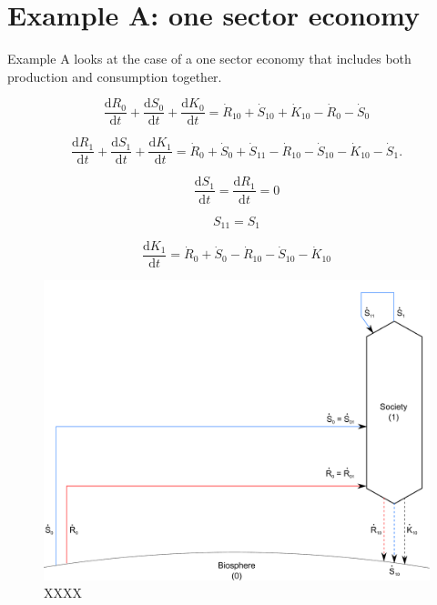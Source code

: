 \section{Example A: one sector economy}
\label{sec:A_materials}

Example A looks at the case of a one sector economy that includes both production and consumption together. 

\begin{equation}\label{eq:dS_0/dt_single_sector}
	\frac{\mathrm{d}R_0}{\mathrm{d}t}
	+ \frac{\mathrm{d}S_0}{\mathrm{d}t}
	+ \frac{\mathrm{d}K_0}{\mathrm{d}t}
	= \dot{R}_{10} + \dot{S}_{10} + \dot{K}_{10}
	- \dot{R}_{0} - \dot{S}_{0}
\end{equation}

\begin{equation} \label{eq:dS_1/dt_single_sector}
	\frac{\mathrm{d}R_{1}}{\mathrm{d}t}
	+ \frac{\mathrm{d}S_{1}}{\mathrm{d}t}
	+ \frac{\mathrm{d}K_{1}}{\mathrm{d}t} 
	= \dot{R}_{0} + \dot{S}_{0} + \dot{S}_{11}
	- \dot{R}_{10} - \dot{S}_{10} - \dot{K}_{10} - \dot{S}_{1}.
\end{equation}

\begin{equation}\label{eq:dS_1/dt_zero}
	\frac{\mathrm{d}S_1}{\mathrm{d}t} = 
	\frac{\mathrm{d}R_1}{\mathrm{d}t} = 0
\end{equation}

\begin{equation}\label{eq:A1_self_cons}
	S_{11} = S_{1}
\end{equation}

\begin{equation}\label{eq:single_sector_material_steady_state}
	\frac{\mathrm{d}K_{1}}{\mathrm{d}t}
	= \dot{R}_{0} + \dot{S}_{0} 
	- \dot{R}_{10} - \dot{S}_{10} - \dot{K}_{10}
\end{equation}

\begin{figure}[h!]
\centering
\includegraphics[width=0.8\linewidth]{Part_1/Chapter_Materials/images/1_sector_materials.pdf}
\caption{XXXX}
\label{fig:A_materials}
\end{figure}

